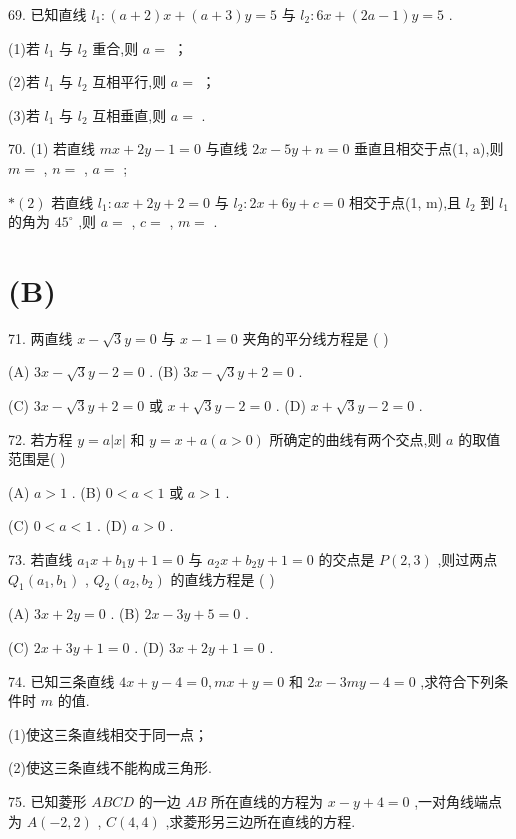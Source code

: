 69. 已知直线 ${l}_{1} : \left( {a + 2}\right) x + \left( {a + 3}\right) y = 5$ 与 ${l}_{2} : {6x} + \left( {{2a} - 1}\right) y = 5$ .

(1)若 ${l}_{1}$ 与 ${l}_{2}$ 重合,则 $a =$ \blkda{}；

(2)若 ${l}_{1}$ 与 ${l}_{2}$ 互相平行,则 $a =$ \blkda{}；

(3)若 ${l}_{1}$ 与 ${l}_{2}$ 互相垂直,则 $a =$ \blkda{}.

70. (1) 若直线 ${mx} + {2y} - 1 = 0$ 与直线 ${2x} - {5y} + n = 0$ 垂直且相交于点(1, a),则 $m =$ \blkda{}, $n =$ \blkda{}, $a =$ \blkda{};

$* \left( 2\right)$ 若直线 ${l}_{1} : {ax} + {2y} + 2 = 0$ 与 ${l}_{2} : {2x} + {6y} + c = 0$ 相交于点(1, m),且 ${l}_{2}$ 到 ${l}_{1}$ 的角为 ${45}^{ \circ  }$ ,则 $a =$ \blkda{}, $c =$ \blkda{}, $m =$ \blkda{}.

\section*{(B)}

71. 两直线 $x - \sqrt{3}y = 0$ 与 $x - 1 = 0$ 夹角的平分线方程是 (   )

(A) ${3x} - \sqrt{3}y - 2 = 0$ . (B) ${3x} - \sqrt{3}y + 2 = 0$ .

(C) ${3x} - \sqrt{3}y + 2 = 0$ 或 $x + \sqrt{3}y - 2 = 0$ . (D) $x + \sqrt{3}y - 2 = 0$ .

72. 若方程 $y = a\left| x\right|$ 和 $y = x + a\left( {a > 0}\right)$ 所确定的曲线有两个交点,则 $a$ 的取值范围是(   )

(A) $a > 1$ . (B) $0 < a < 1$ 或 $a > 1$ .

(C) $0 < a < 1$ . (D) $a > 0$ .

73. 若直线 ${a}_{1}x + {b}_{1}y + 1 = 0$ 与 ${a}_{2}x + {b}_{2}y + 1 = 0$ 的交点是 $P\left( {2,3}\right)$ ,则过两点 ${Q}_{1}\left( {{a}_{1},{b}_{1}}\right)$ , ${Q}_{2}\left( {{a}_{2},{b}_{2}}\right)$ 的直线方程是 (   )

(A) ${3x} + {2y} = 0$ . (B) ${2x} - {3y} + 5 = 0$ .

(C) ${2x} + {3y} + 1 = 0$ . (D) ${3x} + {2y} + 1 = 0$ .

74. 已知三条直线 ${4x} + y - 4 = 0,{mx} + y = 0$ 和 ${2x} - {3my} - 4 = 0$ ,求符合下列条件时 $m$ 的值.

(1)使这三条直线相交于同一点；

(2)使这三条直线不能构成三角形.

75. 已知菱形 ${ABCD}$ 的一边 ${AB}$ 所在直线的方程为 $x - y + 4 = 0$ ,一对角线端点为 $A\left( {-2,2}\right)$ , $C\left( {4,4}\right)$ ,求菱形另三边所在直线的方程.

